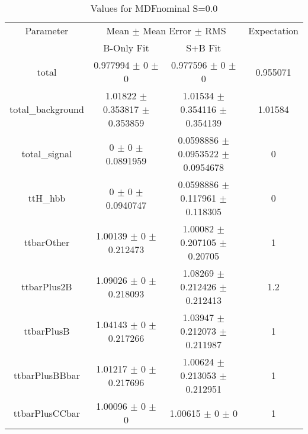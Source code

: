 \begin{table}
\centering
\caption{Values for MDFnominal S=0.0}
\begin{tabular}{cccc}
\toprule
Parameter & \multicolumn{2}{c}{Mean $\pm$ Mean Error $\pm$ RMS} & Expectation\\
 & B-Only Fit & S+B Fit & \\
\midrule
total & \num{0.977994} $\pm$ \num{0} $\pm$ \num{0} & \num{0.977596} $\pm$ \num{0} $\pm$ \num{0} & \num{0.955071}\\
total\_background & \num{1.01822} $\pm$ \num{0.353817} $\pm$ \num{0.353859} & \num{1.01534} $\pm$ \num{0.354116} $\pm$ \num{0.354139} & \num{1.01584}\\
total\_signal & \num{0} $\pm$ \num{0} $\pm$ \num{0.0891959} & \num{0.0598886} $\pm$ \num{0.0953522} $\pm$ \num{0.0954678} & \num{0}\\
ttH\_hbb & \num{0} $\pm$ \num{0} $\pm$ \num{0.0940747} & \num{0.0598886} $\pm$ \num{0.117961} $\pm$ \num{0.118305} & \num{0}\\
ttbarOther & \num{1.00139} $\pm$ \num{0} $\pm$ \num{0.212473} & \num{1.00082} $\pm$ \num{0.207105} $\pm$ \num{0.20705} & \num{1}\\
ttbarPlus2B & \num{1.09026} $\pm$ \num{0} $\pm$ \num{0.218093} & \num{1.08269} $\pm$ \num{0.212426} $\pm$ \num{0.212413} & \num{1.2}\\
ttbarPlusB & \num{1.04143} $\pm$ \num{0} $\pm$ \num{0.217266} & \num{1.03947} $\pm$ \num{0.212073} $\pm$ \num{0.211987} & \num{1}\\
ttbarPlusBBbar & \num{1.01217} $\pm$ \num{0} $\pm$ \num{0.217696} & \num{1.00624} $\pm$ \num{0.213053} $\pm$ \num{0.212951} & \num{1}\\
ttbarPlusCCbar & \num{1.00096} $\pm$ \num{0} $\pm$ \num{0} & \num{1.00615} $\pm$ \num{0} $\pm$ \num{0} & \num{1}\\
\bottomrule
\end{tabular}
\end{table}